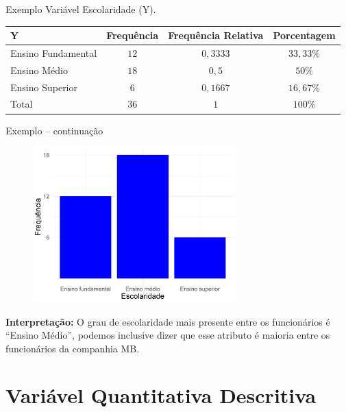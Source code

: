 \documentclass[9pt]{beamer}
\begin{document}
\begin{frame}{Exemplo}
	Variável Escolaridade (Y).
	\begin{table}
		\centering
		\begin{tabular}{l|ccc}
			\toprule[0.05cm]
			Y  & Frequência & Frequência Relativa & Porcentagem\\ \midrule[0.05cm]
			Ensino Fundamental & $12$ & $0,3333$ & $33,33\%$\\ 
			Ensino Médio & $18$ & $0,5$ & $50\%$ \\
			Ensino Superior & $6$ & $0,1667$ & $16,67\%$ \\
			\midrule[0.05cm]
			Total & $36$ & $1$ & $100\%$\\
			\bottomrule[0.05cm]
		\end{tabular}
	\end{table}
	

\end{frame}

\begin{frame}{Exemplo -- continuação}
	\begin{figure}
	\centering
	\includegraphics[height=6cm]{escolaridade.png}
\end{figure}
\textbf{Interpretação:} O grau de escolaridade mais presente entre os funcionários é ``Ensino Médio'', podemos inclusive dizer que esse atributo é maioria entre os funcionários da companhia MB.
\end{frame}

\section{Variável Quantitativa Descritiva}
\end{document}
